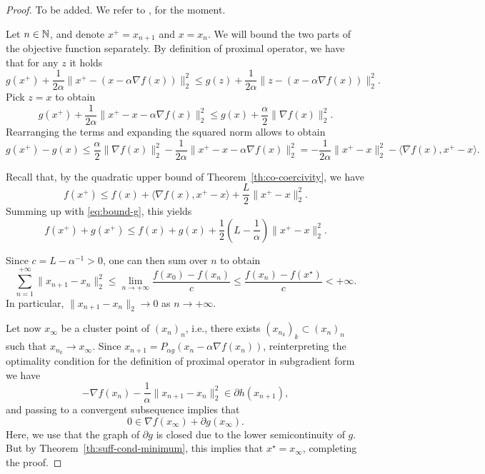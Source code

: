 \documentclass{report}
\begin{document}
\begin{proof}
	To be added. We refer to \cite{fawziLecture}, for the moment.

	Let $n\in\mathbb{N}$, and denote $x^+=x_{n+1}$ and $x=x_n$.
	We will bound the two parts of the objective function separately. 
	By definition of proximal operator, we have that for any $z$ it holds
	\begin{equation}
		g(x^+) + \frac{1}{2\alpha}\|x^+-(x - \alpha \nabla f(x))\|_2^2 
		\le g(z) + \frac{1}{2\alpha}\|z-(x - \alpha \nabla f(x))\|_2^2.
	\end{equation}
	Pick $z=x$ to obtain
	\begin{equation}
		g(x^+) + \frac{1}{2\alpha}\|x^+-x - \alpha \nabla f(x)\|_2^2 
		\le g(x) + \frac{\alpha}{2}\|\nabla f(x)\|_2^2.
	\end{equation}
	Rearranging the terms and expanding the squared norm allows to obtain
	\begin{equation}
		\label{eq:bound-g}
		g(x^+) - g(x) 
		\le\frac{\alpha}{2}\|\nabla f(x)\|_2^2 - \frac{1}{2\alpha}\|x^+-x - \alpha \nabla f(x)\|_2^2 
		= -\frac{1}{2\alpha} \|x^+-x\|_2^2 -\langle \nabla f(x),x^+-x\rangle.
	\end{equation}

	
	Recall that, by the quadratic upper bound of Theorem~\ref{th:co-coercivity}, we have 
	\begin{equation}
		f(x^+) \le f(x) + \langle\nabla f(x),x^+-x\rangle + \frac{L}{2}\|x^+-x\|_2^2.
	\end{equation}
	Summing up with \eqref{eq:bound-g}, this yields 
	\begin{equation}
		f(x^+)+g(x^+) \le f(x)+g(x) +\frac{1}2\left(L-\frac1\alpha\right) \|x^+-x\|_2^2.
	\end{equation}

	Since $c=L-\alpha^{-1}>0$, one can then sum over $n$ to obtain
	\begin{equation}
		\sum_{n=1}^{+\infty}\|x_{n+1}-x_n\|_2^2  \le \lim_{n\to+\infty} \frac{f(x_0)-f(x_n)}{c} \le\frac{f(x_n)-f(x^\star)}{c}  <+\infty.
	\end{equation}
	In particular, $\|x_{n+1}-x_n\|_2\rightarrow 0$ as $n\to +\infty$.

	Let now $x_\infty$ be a cluster point of $(x_n)_n$, i.e., there exists $(x_{n_k})_k\subset (x_n)_n$ such that $x_{n_k} \rightarrow x_\infty$. 
	 Since $x_{n+1}=P_{\alpha g}(x_n-\alpha \nabla f(x_n))$, reinterpreting the optimality condition for the definition of proximal operator in subgradient form we have
	\[
		-\nabla f(x_n)-\frac{1}{\alpha}\|x_{n+1}-x_n\|^2_2\in\partial h(x_{n+1}),
	\]
	and passing to a convergent subsequence implies that 
	\begin{equation}
		0 \in \nabla f(x_\infty)+\partial g(x_\infty).
	\end{equation}
	Here, we use that the graph of $\partial g$ is closed due to the lower semicontinuity of $g$. But by Theorem~\ref{th:suff-cond-minimum}, this implies that $x^\star = x_\infty$, completing the proof.


\end{proof}
\end{document}
